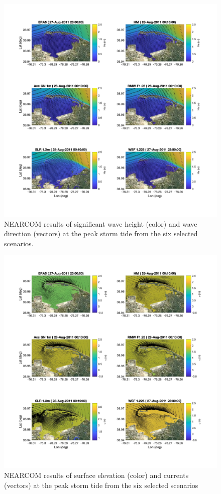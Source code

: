 \documentclass[preprint,12pt,authoryear] {elsarticle}
\begin{document}
\begin{figure}
\centering
\includegraphics[width=\textwidth]{./figures/nearcom_hs.jpg}
\caption{NEARCOM results of significant wave height (color) and wave direction (vectors) at the peak storm tide from the six selected scenarios.}
\label{nearcom_6_cases_hs}
\centering
\end{figure}

\begin{figure}
\centering
\includegraphics[width=\textwidth]{./figures/nearcom_eta_uv.jpg}
\caption{NEARCOM results of surface elevation (color) and currents (vectors) at the peak storm tide from the six selected scenarios}
\label{nearcom_6_cases_eta}
\centering
\end{figure}
\end{document}
